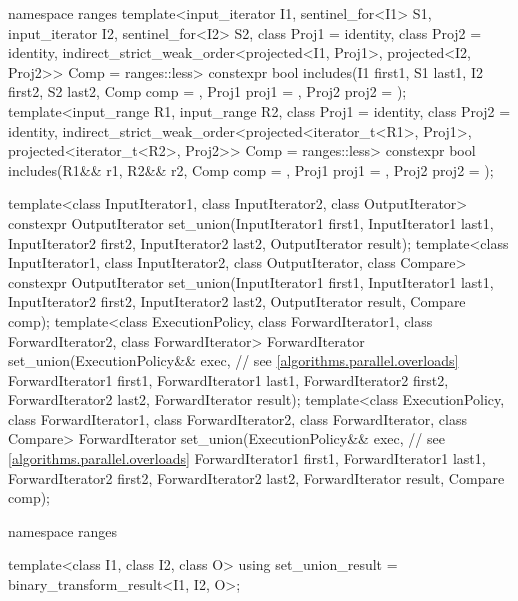 \begin{codeblock}
{  namespace ranges {
    template<input_iterator I1, sentinel_for<I1> S1, input_iterator I2, sentinel_for<I2> S2,
             class Proj1 = identity, class Proj2 = identity,
             indirect_strict_weak_order<projected<I1, Proj1>, projected<I2, Proj2>> Comp =
               ranges::less>
      constexpr bool includes(I1 first1, S1 last1, I2 first2, S2 last2, Comp comp = {},
                              Proj1 proj1 = {}, Proj2 proj2 = {});
    template<input_range R1, input_range R2, class Proj1 = identity,
             class Proj2 = identity,
             indirect_strict_weak_order<projected<iterator_t<R1>, Proj1>,
                                        projected<iterator_t<R2>, Proj2>> Comp = ranges::less>
      constexpr bool includes(R1&& r1, R2&& r2, Comp comp = {},
                              Proj1 proj1 = {}, Proj2 proj2 = {});
  }

  template<class InputIterator1, class InputIterator2, class OutputIterator>
    constexpr OutputIterator
      set_union(InputIterator1 first1, InputIterator1 last1,
                InputIterator2 first2, InputIterator2 last2,
                OutputIterator result);
  template<class InputIterator1, class InputIterator2, class OutputIterator, class Compare>
    constexpr OutputIterator
                set_union(InputIterator1 first1, InputIterator1 last1,
                InputIterator2 first2, InputIterator2 last2,
                OutputIterator result, Compare comp);
  template<class ExecutionPolicy, class ForwardIterator1, class ForwardIterator2,
           class ForwardIterator>
    ForwardIterator
      set_union(ExecutionPolicy&& exec,                         // see \ref{algorithms.parallel.overloads}
                ForwardIterator1 first1, ForwardIterator1 last1,
                ForwardIterator2 first2, ForwardIterator2 last2,
                ForwardIterator result);
  template<class ExecutionPolicy, class ForwardIterator1, class ForwardIterator2,
           class ForwardIterator, class Compare>
    ForwardIterator
      set_union(ExecutionPolicy&& exec,                         // see \ref{algorithms.parallel.overloads}
                ForwardIterator1 first1, ForwardIterator1 last1,
                ForwardIterator2 first2, ForwardIterator2 last2,
                ForwardIterator result, Compare comp);

  namespace ranges {
    template<class I1, class I2, class O>
    using set_union_result = binary_transform_result<I1, I2, O>;

}}
\end{codeblock}
